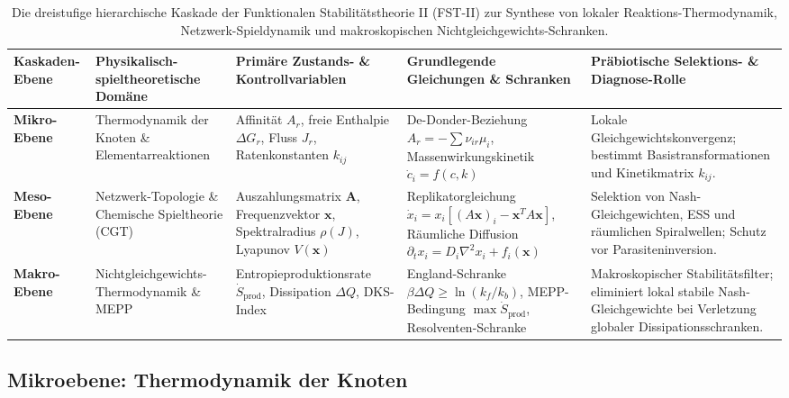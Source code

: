 \documentclass[12pt,a4paper]{article}
\theoremstyle{remark}
\begin{document}
\begin{table}[htbp]
\centering
\caption{Die dreistufige hierarchische Kaskade der Funktionalen Stabilitätstheorie II (FST-II) zur Synthese von lokaler Reaktions-Thermodynamik, Netzwerk-Spieldynamik und makroskopischen Nichtgleichgewichts-Schranken.}
\label{tab:hierarchical-cascade}
\scriptsize
\setlength{\tabcolsep}{2pt}
\begin{tabularx}{\textwidth}{@{}>{\raggedright\arraybackslash}p{}>{\raggedright\arraybackslash}p{}>{\raggedright\arraybackslash}p{}>{\raggedright\arraybackslash}p{}>{\raggedright\arraybackslash}X@{}}
\toprule
\textbf{Kaskaden-Ebene} & \textbf{Physikalisch-spieltheoretische Domäne} & \textbf{Primäre Zustands- \& Kontrollvariablen} & \textbf{Grundlegende Gleichungen \& Schranken} & \textbf{Präbiotische Selektions- \& Diagnose-Rolle} \\
\midrule
\textbf{Mikro-Ebene} & Thermodynamik der Knoten \& Elementarreaktionen & Affinität $A_r$, freie Enthalpie $\Delta G_r$, Fluss $J_r$, Ratenkonstanten $k_{ij}$ & De-Donder-Beziehung $A_r = -\sum \nu_{ir}\mu_i$, Massenwirkungskinetik $\dot{c}_i = f(c,k)$ & Lokale Gleichgewichtskonvergenz; bestimmt Basistransformationen und Kinetikmatrix $k_{ij}$. \\
\midrule
\textbf{Meso-Ebene} & Netzwerk-Topologie \& Chemische Spieltheorie (CGT) & Auszahlungsmatrix $\mathbf{A}$, Frequenzvektor $\mathbf{x}$, Spektralradius $\rho(J)$, Lyapunov $V(\mathbf{x})$ & Replikatorgleichung $\dot{x}_i = x_i [(A\mathbf{x})_i - \mathbf{x}^T A\mathbf{x}]$, Räumliche Diffusion $\partial_t x_i = D_i \nabla^2 x_i + f_i(\mathbf{x})$ & Selektion von Nash-Gleichgewichten, ESS und räumlichen Spiralwellen; Schutz vor Parasiteninversion. \\
\midrule
\textbf{Makro-Ebene} & Nichtgleichgewichts-Thermodynamik \& MEPP & Entropie\-produktions\-rate $\dot{S}_{\text{prod}}$, Dissipation $\Delta Q$, DKS-Index & England-Schranke $\beta \Delta Q \ge \ln(k_f/k_b)$, MEPP-Bedingung $\max \dot{S}_{\text{prod}}$, Resolventen-Schranke & Makroskopischer Stabilitätsfilter; eliminiert lokal stabile Nash-Gleichgewichte bei Verletzung globaler Dissipationsschranken. \\
\bottomrule
\end{tabularx}
\end{table}

\subsection{Mikroebene: Thermodynamik der Knoten}
\end{document}
